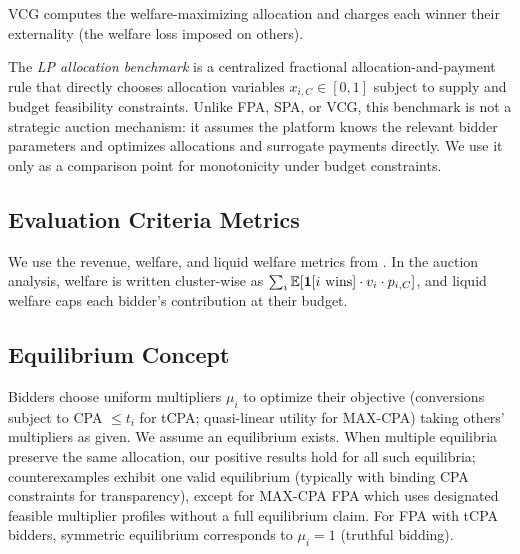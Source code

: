 \begin{definition}
\label{def:vcg}
VCG computes the welfare-maximizing allocation and charges each winner their externality (the welfare loss imposed on others).
\end{definition}

\begin{definition}
\label{def:lp-benchmark}
The \emph{LP allocation benchmark} is a centralized fractional allocation-and-payment rule that directly chooses allocation variables $x_{i,C} \in [0,1]$ subject to supply and budget feasibility constraints. Unlike FPA, SPA, or VCG, this benchmark is not a strategic auction mechanism: it assumes the platform knows the relevant bidder parameters and optimizes allocations and surrogate payments directly. We use it only as a comparison point for monotonicity under budget constraints.
\end{definition}

\subsection{Evaluation Criteria Metrics}

We use the revenue, welfare, and liquid welfare metrics from . In the auction analysis, welfare is written cluster-wise as $\sum_i \mathbb{E}[\mathbf{1}[i \text{ wins}] \cdot v_i \cdot p_{i,C}]$, and liquid welfare caps each bidder's contribution at their budget.

\subsection{Equilibrium Concept}

\begin{assumption}
\label{ass:equilibrium}
Bidders choose uniform multipliers $\mu_i$ to optimize their objective (conversions subject to CPA $\leq t_i$ for tCPA; quasi-linear utility for MAX-CPA) taking others' multipliers as given. We assume an equilibrium exists. When multiple equilibria preserve the same allocation, our positive results hold for all such equilibria; counterexamples exhibit one valid equilibrium (typically with binding CPA constraints for transparency), except for MAX-CPA FPA which uses designated feasible multiplier profiles without a full equilibrium claim. For FPA with tCPA bidders, symmetric equilibrium corresponds to $\mu_i = 1$ (truthful bidding).
\end{assumption}
